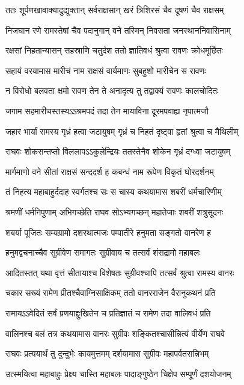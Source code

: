 \twolineshloka
{ततः शूर्पणखावाक्यादुद्युक्तान् सर्वराक्षसान्}
{खरं त्रिशिरसं चैव दूषणं चैव राक्षसम्}%

\twolineshloka
{निजघान रणे रामस्तेषां चैव पदानुगान्}
{वने तस्मिन् निवसता जनस्थाननिवासिनाम्}%

\twolineshloka
{रक्षसां निहतान्यासन् सहस्राणि चतुर्दश}
{ततो ज्ञातिवधं श्रुत्वा रावणः क्रोधमूर्छितः}%

\twolineshloka
{सहायं वरयामास मारीचं नाम राक्षसं}
{वार्यमाणः सुबहुशो मारीचेन स रावणः}%

\twolineshloka
{न विरोधो बलवता क्षमो रावण तेन ते}
{अनादृत्य तु तद्वाक्यं रावणः कालचोदितः}%

\twolineshloka
{जगाम सहमारीचस्तस्यऽऽश्रमपदं तदा}
{तेन मायाविना दूरमपवाह्य नृपात्मजौ}%

\twolineshloka
{जहार भार्यां रामस्य गृध्रं हत्वा जटायुषम्}
{गृध्रं च निहतं दृष्ट्वा हृतां श्रुत्वा च मैथिलीम्}%

\twolineshloka
{राघवः शोकसन्तप्तो विललापऽऽकुलेन्द्रियः}
{ततस्तेनैव शोकेन गृध्रं दग्ध्वा जटायुषम्}%

\twolineshloka
{मार्गमाणो वने सीतां राक्षसं सन्ददर्श ह}
{कबन्धं नाम रूपेण विकृतं घोरदर्शनम्}%

\twolineshloka
{तं निहत्य महाबाहुर्ददाह स्वर्गतश्च सः}
{स चास्य कथयामास शबरीं धर्मचारिणीम्}%

\twolineshloka
{श्रमणीं धर्मनिपुणाम् अभिगच्छेति राघव}
{सोऽभ्यगच्छन् महातेजाः शबरीं शत्रुसूदनः}%

\twolineshloka
{शबर्या पूजितः सम्यग्रामो दशरथात्मजः}
{पम्पातीरे हनुमता सङ्गतो वानरेण ह}%

\twolineshloka
{हनुमद्वचनाच्चैव सुग्रीवेण समागतः}
{सुग्रीवाय च तत्सर्वं शंसद्रामो महाबलः}%

\twolineshloka
{आदितस्तत् यथा वृत्तं सीतायाश्च विशेषतः}
{सुग्रीवश्चापि तत्सर्वं श्रुत्वा रामस्य वानरः}%

\twolineshloka
{चकार सख्यं रामेण प्रीतश्चैवाग्निसाक्षिकम्}
{ततो वानरराजेन वैरानुकथनं प्रति}%

\twolineshloka
{रामायऽऽवेदितं सर्वं प्रणयाद्दुःखितेन च}
{प्रतिज्ञातं च रामेण तदा वालिवधं प्रति}%

\twolineshloka
{वालिनश्च बलं तत्र कथयामास वानरः}
{सुग्रीवः शङ्कितश्चासीन्नित्यं वीर्येण राघवे}%

\twolineshloka
{राघवः प्रत्ययार्थं तु दुन्दुभेः कायमुत्तमम्}
{दर्शयामास सुग्रीवः महापर्वतसन्निभम्}%

\twolineshloka
{उत्स्मयित्वा महाबाहुः प्रेक्ष्य चास्ति महाबलः}
{पादाङ्गुष्ठेन चिक्षेप सम्पूर्णं दशयोजनम्}%

